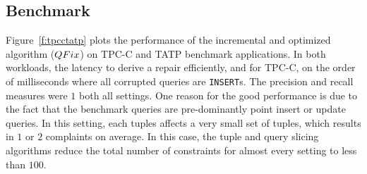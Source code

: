 \subsection{Benchmark}
\label{sec:experiments:benchmark}

Figure~\ref{f:tpcctatp} plots the performance of the incremental and optimized algorithm ($QFix$)
on TPC-C and TATP benchmark applications.  In both workloads, the latency to derive a repair efficiently,
and for TPC-C, on the order of milliseconds where all corrupted queries are \texttt{INSERT}s. 
The precision and recall measures were
$1$ both all settings.   One reason for the good performance is due to the fact that the benchmark queries
are pre-dominantly point insert or update queries.  In this setting, each tuples affects a very small set of 
tuples, which results in $1$ or $2$ complaints on average.  In this case, the tuple and query slicing algorithms
reduce the total number of constraints for almost every setting to less than $100$.


